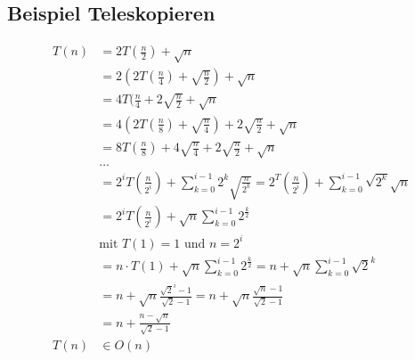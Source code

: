 \documentclass[a4paper,10pt]{article}
\newcommand{\T}[1]{\text{#1}} %
\newcommand{\Sum}[2]{\sum_{#1}^{#2}} %
\begin{document}
\subsection{Beispiel Teleskopieren}
\begin{align*}
T(n) &= 2T(\frac{n}{2})+\sqrt{n}\\
&= 2(2T(\frac{n}{4})+\sqrt{\frac{n}{2}})+\sqrt{n}\\
&= 4T(\frac{n}{4}+2\sqrt{\frac{n}{2}}+\sqrt{n}\\
&= 4(2T(\frac{n}{8})+\sqrt{\frac{n}{4}})+2\sqrt{\frac{n}{2}}+\sqrt{n}\\
&= 8T(\frac{n}{8})+4\sqrt{\frac{n}{4}}+2\sqrt{\frac{n}{2}}+\sqrt{n}\\
&\dots\\
&=2^iT(\frac{n}{2^i})+\Sum{k=0}{i-1}2^k\sqrt{\frac{n}{2^k}}=2^T(\frac{n}{2^i})+\Sum{k=0}{i-1}\sqrt{2^k}\sqrt{n}\\
&=2^iT(\frac{n}{2^i})+\sqrt{n}\Sum{k=0}{i-1}2^\frac{k}{2}\\
&\T{mit }T(1)=1\T{ und }n=2^i\\
&=n\cdot T(1)+\sqrt{n}\Sum{k=0}{i-1}2^\frac{k}{2}=n+\sqrt{n}\Sum{k=0}{i-1}\sqrt{2}^k\\
&=n+\sqrt{n}\frac{\sqrt{2}^i-1}{\sqrt{2}-1}=n+\sqrt{n}\frac{\sqrt{n}-1}{\sqrt{2}-1}\\
&=n+\frac{n-\sqrt{n}}{\sqrt{2}-1}\\
T(n)&\in O(n)
\end{align*}
\end{document}
